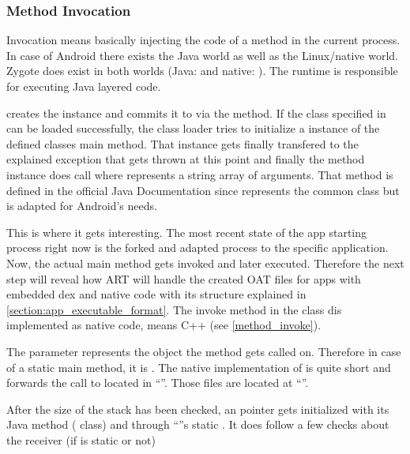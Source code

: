 \subsubsection{Method Invocation}\label{cl_loading}
Invocation means basically injecting the code of a method in the current process.
In case of Android there exists the Java world as well as the Linux/native world.
Zygote does exist in both worlds (Java: 
and native: ). The runtime is responsible for
executing Java layered code.

 creates the  instance and commits it to
 via the  method. If the class specified
in  can be loaded successfully, the class loader tries to initialize a
 instance of the defined classes main method.
That instance  gets finally transfered to the explained exception that gets thrown
at this point and finally the method instance  does call
 where  represents a string array of
arguments. That method is defined in the official Java Documentation \parencite{java_method} since  represents the common  class but is adapted for Android's needs.

This is where it gets interesting. The most recent state of the app starting process
right now is the forked and adapted process to the specific application. Now, the actual main
method gets invoked and later executed. Therefore the next step will reveal how ART will handle the created OAT files for apps with embedded dex and native code with its structure explained in \autoref{section:app_executable_format}. The invoke method in the  class dis implemented as native code, means C++ (see \autoref{method_invoke}).

The  parameter represents the object the method gets called on. Therefore
in case of a static main method, it is . The native implementation of 
is quite short and forwards the call to  located in
``''. Those files are located at ``''.


After the size of the stack has been checked, an  pointer gets initialized with its Java method ( class) and through ``''s static . It does follow a few checks about the receiver (if  is static or
not)

